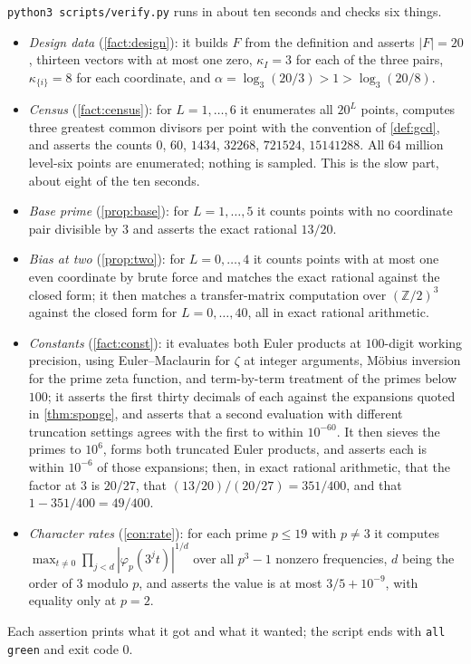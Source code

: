 \documentclass[11pt]{amsart}
\theoremstyle{definition}
\theoremstyle{remark}
\begin{document}
\texttt{python3 scripts/verify.py} runs in about ten seconds and checks six things.
\begin{itemize}
\item \emph{Design data} (\cref{fact:design}): it builds $F$ from the definition and asserts $|F|=20$, thirteen vectors with at most one zero, $\kappa_I=3$ for each of the three pairs, $\kappa_{\{i\}}=8$ for each coordinate, and $\alpha=\log_3(20/3)>1>\log_3(20/8)$.
\item \emph{Census} (\cref{fact:census}): for $L=1,\dots,6$ it enumerates all $20^L$ points, computes three greatest common divisors per point with the convention of \cref{def:gcd}, and asserts the counts $0$, $60$, $1434$, $32268$, $721524$, $15141288$. All $64$ million level-six points are enumerated; nothing is sampled. This is the slow part, about eight of the ten seconds.
\item \emph{Base prime} (\cref{prop:base}): for $L=1,\dots,5$ it counts points with no coordinate pair divisible by $3$ and asserts the exact rational $13/20$.
\item \emph{Bias at two} (\cref{prop:two}): for $L=0,\dots,4$ it counts points with at most one even coordinate by brute force and matches the exact rational against the closed form; it then matches a transfer-matrix computation over $(\mathbb Z/2)^3$ against the closed form for $L=0,\dots,40$, all in exact rational arithmetic.
\item \emph{Constants} (\cref{fact:const}): it evaluates both Euler products at $100$-digit working precision, using Euler--Maclaurin for $\zeta$ at integer arguments, M\"obius inversion for the prime zeta function, and term-by-term treatment of the primes below $100$; it asserts the first thirty decimals of each against the expansions quoted in \cref{thm:sponge}, and asserts that a second evaluation with different truncation settings agrees with the first to within $10^{-60}$. It then sieves the primes to $10^6$, forms both truncated Euler products, and asserts each is within $10^{-6}$ of those expansions; then, in exact rational arithmetic, that the factor at $3$ is $20/27$, that $(13/20)/(20/27)=351/400$, and that $1-351/400=49/400$.
\item \emph{Character rates} (\cref{con:rate}): for each prime $p\le19$ with $p\ne3$ it computes $\max_{t\ne0}\prod_{j<d}|\varphi_p(3^jt)|^{1/d}$ over all $p^3-1$ nonzero frequencies, $d$ being the order of $3$ modulo $p$, and asserts the value is at most $3/5+10^{-9}$, with equality only at $p=2$.
\end{itemize}
Each assertion prints what it got and what it wanted; the script ends with \texttt{all green} and exit code $0$.
\end{document}
